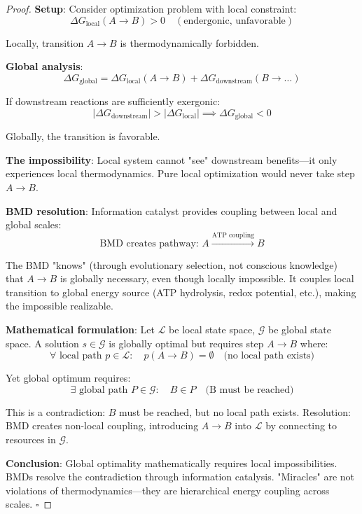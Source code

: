 \begin{proof}
\textbf{Setup}: Consider optimization problem with local constraint:
\begin{equation}
\Delta G_{\text{local}}(A \to B) > 0 \quad (\text{endergonic, unfavorable})
\end{equation}

Locally, transition $A \to B$ is thermodynamically forbidden.

\textbf{Global analysis}:
\begin{equation}
\Delta G_{\text{global}} = \Delta G_{\text{local}}(A \to B) + \Delta G_{\text{downstream}}(B \to \ldots)
\end{equation}

If downstream reactions are sufficiently exergonic:
\begin{equation}
|\Delta G_{\text{downstream}}| > |\Delta G_{\text{local}}| \implies \Delta G_{\text{global}} < 0
\end{equation}

Globally, the transition is favorable.

\textbf{The impossibility}: Local system cannot "see" downstream benefits—it only experiences local thermodynamics. Pure local optimization would never take step $A \to B$.

\textbf{BMD resolution}: Information catalyst provides coupling between local and global scales:
\begin{equation}
\text{BMD creates pathway: } A \xrightarrow{\text{ATP coupling}} B
\end{equation}

The BMD "knows" (through evolutionary selection, not conscious knowledge) that $A \to B$ is globally necessary, even though locally impossible. It couples local transition to global energy source (ATP hydrolysis, redox potential, etc.), making the impossible realizable.

\textbf{Mathematical formulation}: Let $\mathcal{L}$ be local state space, $\mathcal{G}$ be global state space. A solution $s \in \mathcal{G}$ is globally optimal but requires step $A \to B$ where:
\begin{equation}
\forall \text{ local path } p \in \mathcal{L}: \quad p(A \to B) = \emptyset \quad \text{(no local path exists)}
\end{equation}

Yet global optimum requires:
\begin{equation}
\exists \text{ global path } P \in \mathcal{G}: \quad B \in P \quad \text{(B must be reached)}
\end{equation}

This is a contradiction: $B$ must be reached, but no local path exists. Resolution: BMD creates non-local coupling, introducing $A \to B$ into $\mathcal{L}$ by connecting to resources in $\mathcal{G}$.

\textbf{Conclusion}: Global optimality mathematically requires local impossibilities. BMDs resolve the contradiction through information catalysis. "Miracles" are not violations of thermodynamics—they are hierarchical energy coupling across scales. $\square$
\end{proof}

